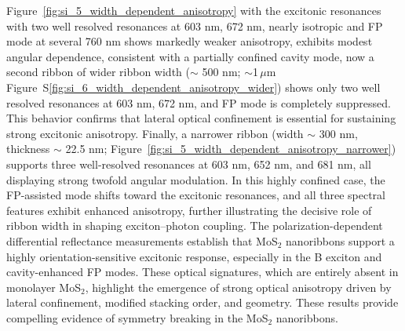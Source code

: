 \documentclass[journal=jacsnano,manuscript=article]{achemso}
\begin{document}
Figure~\ref{fig:si_5_width_dependent_anisotropy} with the excitonic resonances with two well resolved resonances at 603 nm, 672 nm, nearly isotropic and FP mode at several 760 nm shows markedly weaker anisotropy, exhibits modest angular dependence, consistent with a partially confined cavity mode, now a second ribbon of wider ribbon width ($\sim$ 500 nm; $\sim$1\,$\mu$m Figure~S\ref{fig:si_6_width_dependent_anisotropy_wider}) shows only two well resolved resonances at 603 nm, 672 nm, and FP mode
is completely suppressed. This behavior confirms that lateral optical confinement is essential for sustaining strong excitonic anisotropy. Finally, a narrower ribbon (width $\sim$ 300 nm, thickness $\sim$ 22.5 nm; Figure~\ref{fig:si_5_width_dependent_anisotropy_narrower}) supports three well-resolved resonances at 603 nm, 652 nm, and 681 nm, all displaying strong twofold angular modulation. In this highly confined case, the FP-assisted mode shifts toward the excitonic resonances, and all three spectral features exhibit enhanced anisotropy, further illustrating the decisive role of ribbon width in shaping exciton–photon coupling. The polarization-dependent differential reflectance measurements establish 
that MoS$_2$ nanoribbons support a highly orientation-sensitive excitonic response, 
especially in the B exciton and cavity-enhanced FP modes. These optical signatures, which are entirely absent in monolayer MoS$_2$, highlight the emergence of strong optical anisotropy driven by lateral confinement, modified stacking order, and  geometry. These results provide compelling evidence of symmetry breaking in the MoS$_2$ nanoribbons.
\end{document}
